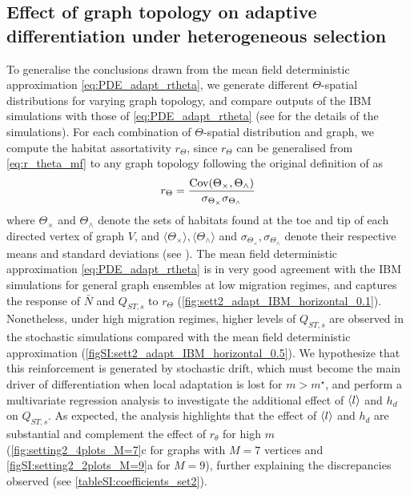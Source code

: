 \subsection{Effect of graph topology on adaptive differentiation under heterogeneous selection}\label{sec:result2b}
To generalise the conclusions drawn from the mean field deterministic approximation \cref{eq:PDE_adapt_rtheta}, we generate different $\Theta$-spatial distributions for varying graph topology, and compare outputs of the IBM simulations with those of \cref{eq:PDE_adapt_rtheta} (see  for the details of the simulations). For each combination of $\Theta$-spatial distribution and graph, we compute the habitat assortativity $r_\Theta$, since $r_\Theta$ can be generalised from \cref{eq:r_theta_mf} to any graph topology following the original definition of \citep{Newman2003a} as
\begin{equation}\label{eq:r_theta}
  r_\Theta = \frac{\mbox{Cov}({ \Theta}_\times, { \Theta}_\wedge)}{\sigma_{{ \Theta}_\times} \sigma_{{ \Theta}_\wedge}}
\end{equation}
where ${ \Theta}_\times$ and ${ \Theta}_\wedge$ denote the sets of habitats found at the toe and tip of each directed vertex of graph $V$, and $\langle { \Theta}_\times \rangle, \langle {\Theta}_\wedge \rangle$ and $\sigma_{{\Theta}_\times}, \sigma_{{\Theta}_\wedge}$ denote their respective means and standard deviations (see ). 
%
The mean field deterministic approximation \cref{eq:PDE_adapt_rtheta} is in very good agreement with the IBM simulations for general graph ensembles at low migration regimes, and captures the response of $\bar{N}$ and $Q_{ST,s}$ to $r_\Theta$ (\cref{fig:sett2_adapt_IBM_horizontal_0.1}). Nonetheless, under high migration regimes, higher levels of $Q_{ST,s}$ are observed in the stochastic simulations compared with the mean field deterministic approximation (\cref{figSI:sett2_adapt_IBM_horizontal_0.5}). We hypothesize that this reinforcement is generated by stochastic drift, which must become the main driver of differentiation when local adaptation is lost for $m>m^\star$, and perform a multivariate regression analysis to investigate the additional effect of $\langle l \rangle$ and $h_d$ on $Q_{ST,s}$. As expected, the analysis highlights that the effect of $\langle l \rangle$ and $h_d$ are substantial and complement the effect of $r_\theta$ for high $m$ (\cref{fig:setting2_4plots_M=7}c for graphs with $M = 7$ vertices and \cref{figSI:setting2_2plots_M=9}a for $M=9$), further explaining the discrepancies observed (see \cref{tableSI:coefficients_set2}).

